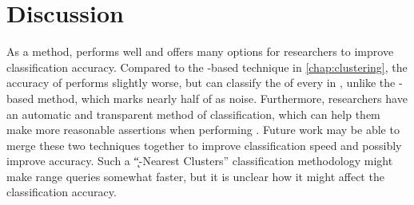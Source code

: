 \section{Discussion}\label{sec:discussion:krap}
As a \mst{} method, \krap{} performs well and offers many options for \cp{} researchers to improve classification accuracy.
Compared to the \dbscan{}-based \mst{} technique in \autoref{chap:clustering}, the accuracy of \krap{} performs slightly worse, but can classify the \spec{} of every \isol{} in \cplop{}, unlike the \dbscan{}-based method, which marks nearly half of \cplop{} as noise.
Furthermore, researchers have an automatic and transparent method of \spec{} classification, which can help them make more reasonable assertions when performing \mst{}.
Future work may be able to merge these two techniques together to improve classification speed and possibly improve \mst{} accuracy.
Such a ``\k{}-Nearest Clusters'' classification methodology might make range queries somewhat faster, but it is unclear how it might affect the classification accuracy.